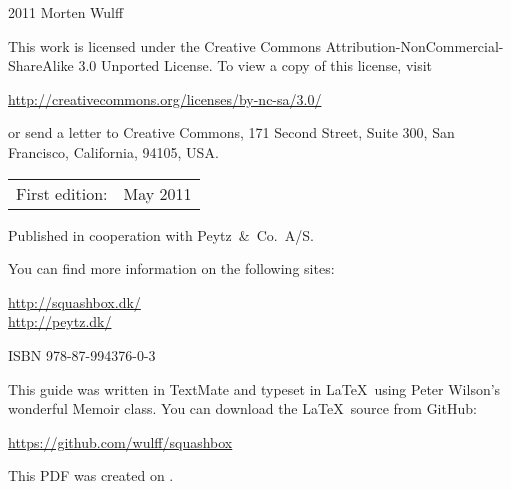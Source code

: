 \begingroup
\footnotesize
\setlength{\parindent}{0pt}
\setlength{\parskip}{\baselineskip}

\textcopyright{} 2011 Morten Wulff

This work is licensed under the Creative Commons Attribution-NonCom\-mercial-ShareAlike 3.0 Unported License. To view a copy of this license, visit

\url{http://creativecommons.org/licenses/by-nc-sa/3.0/}

or send a letter to Creative Commons, 171 Second Street, Suite 300, San Francisco, California, 94105, USA.

\begin{center}
\begin{tabular}{ll}
First edition: & May 2011 \\
\end{tabular}
\end{center}

Published in cooperation with Peytz~\&~Co.\ A/S.

You can find more information on the following sites:

\url{http://squashbox.dk/} \\
\url{http://peytz.dk/}

\vspace{2\baselineskip}

ISBN 978-87-994376-0-3

\vspace{2\baselineskip}

This guide was written in TextMate and typeset in \LaTeX~using Peter Wilson's wonderful Memoir class. You can download the \LaTeX~source from GitHub:

\url{https://github.com/wulff/squashbox}

\vspace{2\baselineskip}

This PDF was created on \thedate.

\endgroup

\thispagestyle{empty}

\clearpage
